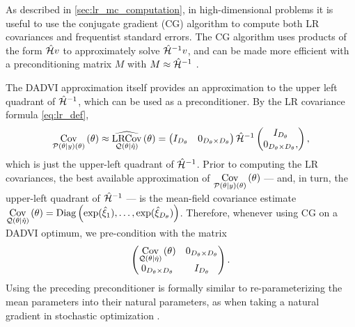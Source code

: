 
As described in \cref{sec:lr_mc_computation}, in high-dimensional problems it is
useful to use the conjugate gradient (CG) algorithm to compute both LR
covariances and frequentist standard errors.  The CG algorithm uses products of
the form $\h v$ to approximately solve $\h^{-1}v$, and can be made more
efficient with a preconditioning matrix $M$ with $M \approx \h^{-1}$
\citep[Chapter 5]{wright:1999:optimization}.

The DADVI approximation itself provides an approximation to the upper left
quadrant of $\h^{-1}$, which can be used as a preconditioner. By the LR
covariance formula \cref{eq:lr_def},
%
\begin{align*}
%
\cov{\post(\theta)}{\theta} \approx
\lrcov{\q(\theta \vert \etahat)}{\theta} =
\begin{pmatrix}
\ident & \zerod[\thetadim \times \thetadim]
\end{pmatrix}
\h^{-1}
\begin{pmatrix}
\ident \\ \zerod[\thetadim \times \thetadim],
\end{pmatrix},
%
\end{align*}
%
which is just the upper-left quadrant of $\h^{-1}$.  Prior
to computing the LR covariances, the best available approximation
of $\cov{\post(\theta)}{\theta}$ --- and, in turn, the upper-left quadrant
of $\h^{-1}$ --- is the mean-field covariance estimate
%
$\cov{\q(\theta \vert \etahat)}{\theta} = \diag{\exp(\etaxihat[1]), \ldots, \exp(\etaxihat[\thetadim])}$.
%
Therefore, whenever using CG on a DADVI optimum, we pre-condition
with the matrix
%
\begin{align*}
%
\begin{pmatrix}
\cov{\q(\theta \vert \etahat)}{\theta} &
    \zerod[\thetadim \times \thetadim] \\
\zerod[\thetadim \times \thetadim] &
    \ident
\end{pmatrix}.
%
\end{align*}
%
Using the preceding preconditioner is formally similar to re-parameterizing the
mean parameters into their natural parameters, as when taking a natural gradient
in stochastic optimization \citep{hoffman:2013:stochasticvi}.
